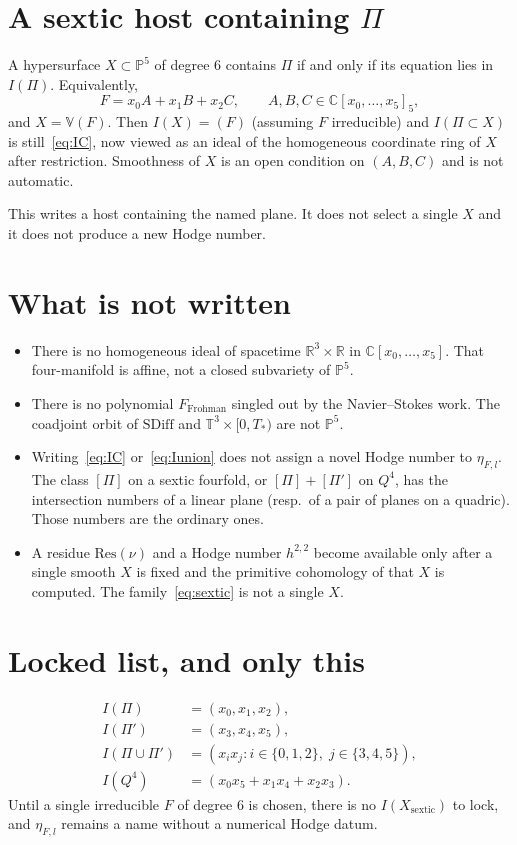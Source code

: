 \documentclass[11pt,a4paper]{article}
\begin{document}
\section{A sextic host containing $\Pi$}

A hypersurface $X\subset\mathbb{P}^5$ of degree $6$ contains $\Pi$ if and only if its equation lies in $I(\Pi)$. Equivalently,
\begin{equation}
\label{eq:sextic}
F=x_0A+x_1B+x_2C,\qquad A,B,C\in\mathbb{C}[x_0,\ldots,x_5]_5,
\end{equation}
and $X=\mathbb{V}(F)$. Then $I(X)=(F)$ (assuming $F$ irreducible) and $I(\Pi\subset X)$ is still~\eqref{eq:IC}, now viewed as an ideal of the homogeneous coordinate ring of $X$ after restriction. Smoothness of $X$ is an open condition on $(A,B,C)$ and is not automatic.

This writes a host containing the named plane. It does not select a single $X$ and it does not produce a new Hodge number.

\section{What is not written}

\begin{itemize}
\item There is no homogeneous ideal of spacetime $\mathbb{R}^3\times\mathbb{R}$ in $\mathbb{C}[x_0,\ldots,x_5]$. That four-manifold is affine, not a closed subvariety of $\mathbb{P}^5$.
\item There is no polynomial $F_{\mathrm{Frohman}}$ singled out by the Navier--Stokes work. The coadjoint orbit of $\mathrm{SDiff}$ and $\mathbb{T}^3\times[0,T_*)$ are not $\mathbb{P}^5$.
\item Writing~\eqref{eq:IC} or~\eqref{eq:Iunion} does not assign a novel Hodge number to $\eta_{F,l}$. The class $[\Pi]$ on a sextic fourfold, or $[\Pi]+[\Pi']$ on $Q^4$, has the intersection numbers of a linear plane (resp.\ of a pair of planes on a quadric). Those numbers are the ordinary ones.
\item A residue $\mathrm{Res}(\nu)$ and a Hodge number $h^{2,2}$ become available only after a single smooth $X$ is fixed and the primitive cohomology of that $X$ is computed. The family~\eqref{eq:sextic} is not a single $X$.
\end{itemize}

\section{Locked list, and only this}

\[
\begin{aligned}
I(\Pi)&=(x_0,x_1,x_2),\\
I(\Pi')&=(x_3,x_4,x_5),\\
I(\Pi\cup\Pi')&=(x_ix_j:i\in\{0,1,2\},\;j\in\{3,4,5\}),\\
I(Q^4)&=(x_0x_5+x_1x_4+x_2x_3).
\end{aligned}
\]
Until a single irreducible $F$ of degree $6$ is chosen, there is no $I(X_{\mathrm{sextic}})$ to lock, and $\eta_{F,l}$ remains a name without a numerical Hodge datum.
\end{document}
